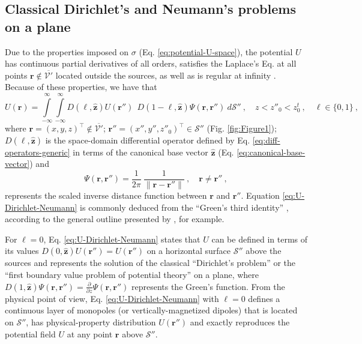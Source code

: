 \subsection{Classical Dirichlet's and Neumann's problems on a plane}
\label{subsec:dirichlet_neumann}

Due to the properties imposed on $\sigma$ (Eq. \ref{eq:potential-U-space}), the potential 
$U$ has continuous partial derivatives of all orders, 
satisfies the Laplace's Eq. at all points $\mathbf{r} \notin \overline{\mathcal{V}'}$ 
located outside the sources, as well as is regular at infinity \citep[][p. 122--124, 217]{kellogg1967}.
Because of these properties, we have that
\begin{equation}
	U(\mathbf{r}) = 
	\int\limits_{-\infty}^{\infty} \int\limits_{-\infty}^{\infty}
	D(\ell, \hat{\mathbf{z}}) U(\mathbf{r}'') \:\: 
	D(1 - \ell, \hat{\mathbf{z}}) \Psi(\mathbf{r}, \mathbf{r}'')
	\: d\mathcal{S}'' \: , \quad  z < z''_{0} < z^{t}_{0} \: ,
	\quad \ell \in \{0, 1\} \: ,
	\label{eq:U-Dirichlet-Neumann}
\end{equation}
where $\mathbf{r} = (x, y, z)^{\top} \notin \overline{\mathcal{V}'}$; 
$\mathbf{r}'' = (x'', y'', z''_{0})^{\top} \in \mathcal{S}''$ (Fig. \ref{fig:Figure1}); 
$D(\ell, \hat{\mathbf{z}})$ is the space-domain differential operator 
defined by Eq. \ref{eq:diff-operators-generic} in terms of the canonical base vector 
$\hat{\mathbf{z}}$ (Eq. \ref{eq:canonical-base-vector}) and 
\begin{equation}
	\Psi(\mathbf{r}, \mathbf{r}'') = 
	\frac{1}{2\pi} \: 
	\frac{1}{\| \mathbf{r} - \mathbf{r}'' \|} \: , 
	\quad \mathbf{r} \ne \mathbf{r}'' \: ,
	\label{eq:Psi}
\end{equation}
represents the scaled inverse distance function between $\mathbf{r}$ and $\mathbf{r}''$. 
Equation \ref{eq:U-Dirichlet-Neumann} is commonly deduced from 
the ``Green's third identity'' \citep[][p. 219]{kellogg1967}, according to
the general outline presented by \cite{roy1962}, for example.

For $\ell = 0$, Eq. \ref{eq:U-Dirichlet-Neumann} states that $U$ can be defined
in terms of its values $D(0, \hat{\mathbf{z}}) U(\mathbf{r}'') = U(\mathbf{r}'')$ on a horizontal surface $\mathcal{S}''$ 
above the sources and represents the solution of the classical ``Dirichlet’s problem'' or the 
``first boundary value problem of potential theory'' \citep[][p. 236]{kellogg1967} on a plane, where 
$D(1, \hat{\mathbf{z}}) \Psi(\mathbf{r}, \mathbf{r}'') = \tfrac{\partial}{\partial z} \Psi(\mathbf{r}, \mathbf{r}'')$ 
represents the Green's function.
From the physical point of view, Eq. \ref{eq:U-Dirichlet-Neumann} with $\ell = 0$ defines a continuous 
layer of monopoles (or vertically-magnetized dipoles) that is located on $\mathcal{S}''$, has 
physical-property distribution $U(\mathbf{r}'')$ and exactly reproduces the 
potential field $U$ at any point $\mathbf{r}$ above $\mathcal{S}''$.

